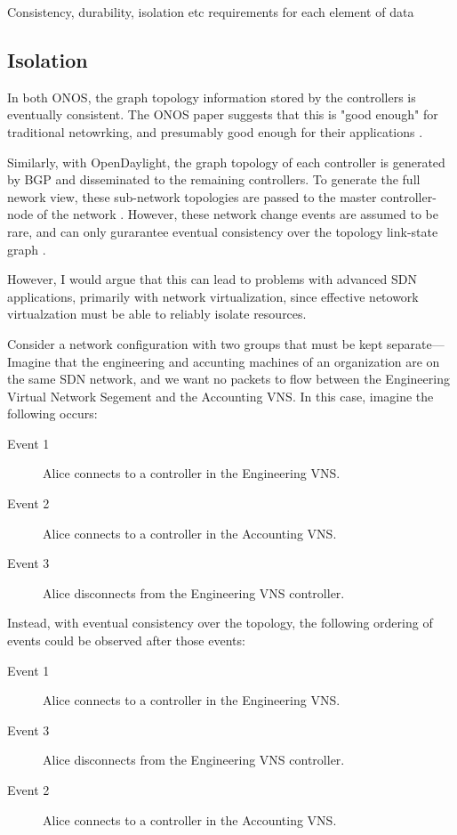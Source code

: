 \documentclass[letterpaper,twocolumn,10pt]{article}
\begin{document}
Consistency, durability, isolation etc requirements for each element of data
\subsection{Isolation}

In both ONOS, the graph topology information stored by the controllers is eventually consistent. The ONOS paper suggests that this is "good enough" for traditional netowrking, and presumably good enough for their applications \cite{berde2014onos}. 

Similarly, with OpenDaylight, the graph topology of each controller is generated by BGP and disseminated to the remaining controllers. To generate the full nework view, these sub-network topologies are passed to the master controller-node of the network \cite{ONV:wiki}. However, these network change events are assumed to be rare, and can only gurarantee eventual consistency over the topology link-state graph \cite{bgp:rfc}.

However, I would argue that this can lead to problems with advanced SDN applications, primarily with network virtualization, since effective netowork virtualzation must be able to reliably isolate resources.

Consider a network configuration with two groups that must be kept separate---Imagine that the engineering and accunting machines of an organization are on the same SDN network, and we want no packets to flow between the Engineering Virtual Network Segement and the Accounting VNS. In this case, imagine the following occurs:

\begin{description}
\item [Event 1] Alice connects to a controller in the Engineering VNS.
\item [Event 2] Alice connects to a controller in the Accounting VNS.
\item [Event 3] Alice disconnects from  the Engineering VNS controller.
\end{description}

Instead, with eventual consistency over the topology, the following ordering of events could be observed after those events:

\begin{description}
\item [Event 1] Alice connects to a controller in the Engineering VNS.
\item [Event 3] Alice disconnects from the Engineering VNS controller.
\item [Event 2] Alice connects to a controller in the Accounting VNS.
\end{description}
\end{document}
